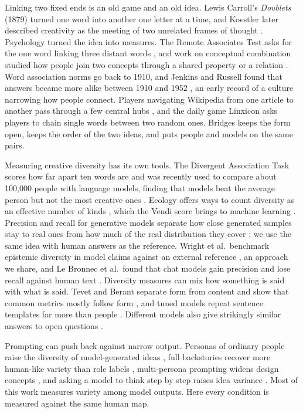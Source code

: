 \documentclass[11pt]{article}
\begin{document}
Linking two fixed ends is an old game and an old idea. Lewis Carroll's \emph{Doublets} (1879) turned one word into another one letter at a time, and Koestler later described creativity as the meeting of two unrelated frames of thought \citep{koestler1964}. Psychology turned the idea into measures. The Remote Associates Test asks for the one word linking three distant words \citep{mednick1962}, and work on conceptual combination studied how people join two concepts through a shared property or a relation \citep{wisniewski1997}. Word association norms go back to 1910, and Jenkins and Russell found that answers became more alike between 1910 and 1952 \citep{jenkins1960}, an early record of a culture narrowing how people connect. Players navigating Wikipedia from one article to another pass through a few central hubs \citep{west2012}, and the daily game Linxicon asks players to chain single words between two random ones. Bridges keeps the form open, keeps the order of the two ideas, and puts people and models on the same pairs.

Measuring creative diversity has its own tools. The Divergent Association Task scores how far apart ten words are \citep{olson2021} and was recently used to compare about 100{,}000 people with language models, finding that models beat the average person but not the most creative ones \citep{bellemare2026}. Ecology offers ways to count diversity as an effective number of kinds \citep{jost2006}, which the Vendi score brings to machine learning \citep{friedman2023}. Precision and recall for generative models separate how close generated samples stay to real ones from how much of the real distribution they cover \citep{kynkaanniemi2019}; we use the same idea with human answers as the reference. Wright et al.\ benchmark epistemic diversity in model claims against an external reference \citep{wright2025}, an approach we share, and Le Bronnec et al.\ found that chat models gain precision and lose recall against human text \citep{lebronnec2024}. Diversity measures can mix how something is said with what is said. Tevet and Berant separate form from content and show that common metrics mostly follow form \citep{tevet2021}, and tuned models repeat sentence templates far more than people \citep{shaib2024}. Different models also give strikingly similar answers to open questions \citep{jiang2025}.

Prompting can push back against narrow output. Personas of ordinary people raise the diversity of model-generated ideas \citep{deng2026}, full backstories recover more human-like variety than role labels \citep{moon2024}, multi-persona prompting widens design concepts \citep{feng2025}, and asking a model to think step by step raises idea variance \citep{meincke2024}. Most of this work measures variety among model outputs. Here every condition is measured against the same human map.
\end{document}
